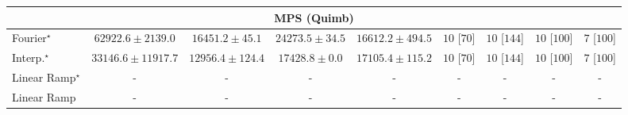 \begin{tabular}{l|cccc|cccc|}
\cline{1-9}
\multicolumn{9}{c}{\rule{0pt}{8pt}MPS (Quimb)} \\
\midrule
Fourier$^\star$ & {\cellcolor[HTML]{9E3604}} \color[HTML]{F1F1F1} $62922.6\pm 2139.0$ & {\cellcolor[HTML]{FFFBD2}} \color[HTML]{000000} $16451.2\pm 45.1$ & {\cellcolor[HTML]{FEECA4}} \color[HTML]{000000} $24273.5\pm 34.5$ & {\cellcolor[HTML]{FFFBD0}} \color[HTML]{000000} $16612.2\pm 494.5$ & {\cellcolor[HTML]{49006A}} \color[HTML]{F1F1F1} $10$ [$70$] & {\cellcolor[HTML]{49006A}} \color[HTML]{F1F1F1} $10$ [$144$] & {\cellcolor[HTML]{49006A}} \color[HTML]{F1F1F1} $10$ [$100$] & {\cellcolor[HTML]{CD238F}} \color[HTML]{F1F1F1} $7$ [$100$] \\
Interp.$^\star$ & {\cellcolor[HTML]{FECA5D}} \color[HTML]{000000} $33146.6\pm 11917.7$ & {\cellcolor[HTML]{FFFFE5}} \color[HTML]{000000} $12956.4\pm 124.4$ & {\cellcolor[HTML]{FFFACD}} \color[HTML]{000000} $17428.8\pm 0.0$ & {\cellcolor[HTML]{FFFACE}} \color[HTML]{000000} $17105.4\pm 115.2$ & {\cellcolor[HTML]{49006A}} \color[HTML]{F1F1F1} $10$ [$70$] & {\cellcolor[HTML]{49006A}} \color[HTML]{F1F1F1} $10$ [$144$] & {\cellcolor[HTML]{49006A}} \color[HTML]{F1F1F1} $10$ [$100$] & {\cellcolor[HTML]{CD238F}} \color[HTML]{F1F1F1} $7$ [$100$] \\
Linear Ramp$^\star$ & {\cellcolor[HTML]{000000}} \color[HTML]{F1F1F1} {\cellcolor{white}} \color{black} - & {\cellcolor[HTML]{000000}} \color[HTML]{F1F1F1} {\cellcolor{white}} \color{black} - & {\cellcolor[HTML]{000000}} \color[HTML]{F1F1F1} {\cellcolor{white}} \color{black} - & {\cellcolor[HTML]{000000}} \color[HTML]{F1F1F1} {\cellcolor{white}} \color{black} - & {\cellcolor[HTML]{000000}} \color[HTML]{F1F1F1} {\cellcolor{white}} \color{black} - & {\cellcolor[HTML]{000000}} \color[HTML]{F1F1F1} {\cellcolor{white}} \color{black} - & {\cellcolor[HTML]{000000}} \color[HTML]{F1F1F1} {\cellcolor{white}} \color{black} - & {\cellcolor[HTML]{000000}} \color[HTML]{F1F1F1} {\cellcolor{white}} \color{black} - \\
Linear Ramp & {\cellcolor[HTML]{000000}} \color[HTML]{F1F1F1} {\cellcolor{white}} \color{black} - & {\cellcolor[HTML]{000000}} \color[HTML]{F1F1F1} {\cellcolor{white}} \color{black} - & {\cellcolor[HTML]{000000}} \color[HTML]{F1F1F1} {\cellcolor{white}} \color{black} - & {\cellcolor[HTML]{000000}} \color[HTML]{F1F1F1} {\cellcolor{white}} \color{black} - & {\cellcolor[HTML]{000000}} \color[HTML]{F1F1F1} {\cellcolor{white}} \color{black} - & {\cellcolor[HTML]{000000}} \color[HTML]{F1F1F1} {\cellcolor{white}} \color{black} - & {\cellcolor[HTML]{000000}} \color[HTML]{F1F1F1} {\cellcolor{white}} \color{black} - & {\cellcolor[HTML]{000000}} \color[HTML]{F1F1F1} {\cellcolor{white}} \color{black} - \\

\end{tabular}
